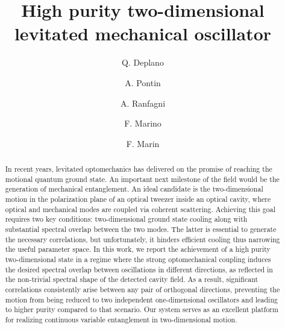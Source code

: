 \documentclass[11pt,floatfix,amssymb,prx,aps,longbibliography,superscriptaddress,nopacs]{revtex4-2}
\begin{document}
\title{High purity two-dimensional levitated mechanical oscillator}

\author{Q. Deplano}

\author{A. Pontin}

\author{A. Ranfagni}

\author{F. Marino}

\author{F. Marin}


\begin{abstract}
In recent years, levitated optomechanics has delivered on the promise of reaching the motional quantum ground state. An important next milestone of the field would be the generation of mechanical entanglement. An ideal candidate is the two-dimensional motion in the polarization plane of an optical tweezer inside an optical cavity, where optical and mechanical modes are coupled via coherent scattering. Achieving this goal requires two key conditions: two-dimensional ground state cooling along with substantial spectral overlap between the two modes. The latter is essential to generate the necessary correlations, but unfortunately, it hinders efficient cooling thus narrowing the useful parameter space. In this work, we report the achievement of a high purity two-dimensional state in a regime where the strong optomechanical coupling induces the desired spectral overlap between oscillations in different directions, as reflected in the non-trivial spectral shape of the detected cavity field. As a result, significant correlations consistently arise between any pair of orthogonal directions, preventing the motion from being reduced to two independent one-dimensional oscillators and leading to higher purity compared to that scenario. Our system serves as an excellent platform for realizing continuous variable entanglement in two-dimensional motion.


\end{abstract}
\end{document}
